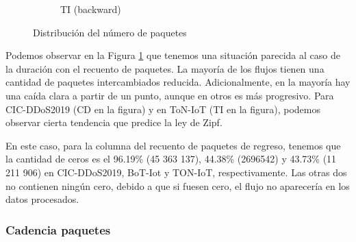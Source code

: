 \begin{figure}[H]
\begin{subfigure}[b]{0.26\textwidth}
        \caption{TI (backward)}
    \end{subfigure}
    \hfill
       \caption{Distribución del número de paquetes}
       \label{fig:packet_pincer_packet_count}
\end{figure}

Podemos observar en la Figura \ref{fig:packet_pincer_packet_count} que tenemos una situación parecida al caso de la duración con el recuento de paquetes. La mayoría de los flujos tienen una cantidad de paquetes intercambiados reducida. Adicionalmente, en la mayoría hay una caída clara a partir de un punto, aunque en otros es más progresivo. Para CIC-DDoS2019 (CD en la figura) y en ToN-IoT (TI en la figura), podemos observar cierta tendencia que predice la ley de Zipf.

En este caso, para la columna del recuento de paquetes de regreso, tenemos que la cantidad de ceros es el 96.19\% (45 363 137), 44.38\% (2696542) y 43.73\% (11 211 906) en CIC-DDoS2019, BoT-Iot y TON-IoT, respectivamente.  Las otras dos no contienen ningún cero, debido a que si fuesen cero, el flujo no aparecería en los datos procesados.

\subsubsection{Cadencia paquetes}

